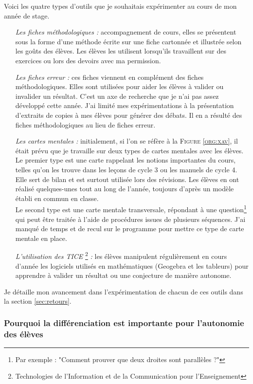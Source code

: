 Voici les quatre types d'outils que je souhaitais expérimenter au cours de mon année de stage.
\begin{itemize}
	\item [\textit{Les fiches méthodologiques :}] accompagnement de cours, elles se présentent sous la forme d'une méthode écrite sur une fiche cartonnée et illustrée selon les goûts des élèves. Les élèves les utilisent lorsqu'ils travaillent sur des exercices ou lors des devoirs avec ma permission.
	\item [\textit{Les fiches erreur :}] ces fiches viennent en complément des fiches méthodologiques. Elles sont utilisées pour aider les élèves à valider ou invalider un résultat. C'est un axe de recherche que je n'ai pas assez développé cette année. J'ai limité mes expérimentations à la présentation d'extraits de copies à mes élèves pour générer des débats. Il en a résulté des fiches méthodologiques au lieu de fiches erreur.
	\item [\textit{Les cartes mentales :}] initialement, si l'on se réfère à la  \textsc{Figure \ref{org:xav}}, il était prévu que je travaille sur deux types de cartes mentales avec les élèves. Le premier type est une carte rappelant les notions importantes du cours, telles qu'on les trouve dans les leçons de cycle 3 ou les manuels de cycle 4. Elle sert de bilan et est surtout utilisée lors des révisions. Les élèves en ont réalisé quelques-unes tout au long de l'année, toujours d'après un modèle établi en commun en classe. \\
	Le second type est une carte mentale transversale, répondant à une question\footnote{Par exemple : "Comment prouver que deux droites sont parallèles ?"} qui peut être traitée à l'aide de procédures issues de plusieurs séquences. J'ai manqué de temps et de recul sur le programme pour mettre ce type de carte mentale en place.
	\item [\textit{L'utilisation des TICE}]\footnote{Technologies de l'Information et de la Communication pour l'Enseignement} \textit{:} les élèves manipulent régulièrement en cours d'année les logiciels utilisés en mathématiques (Geogebra et les tableurs) pour apprendre à valider un résultat ou une conjecture de manière autonome.
\end{itemize}

Je détaille mon avancement dans l'expérimentation de chacun de ces outils dans la section \ref{sec:retours}.

\subsubsection{Pourquoi la différenciation est importante pour l'autonomie des élèves}

